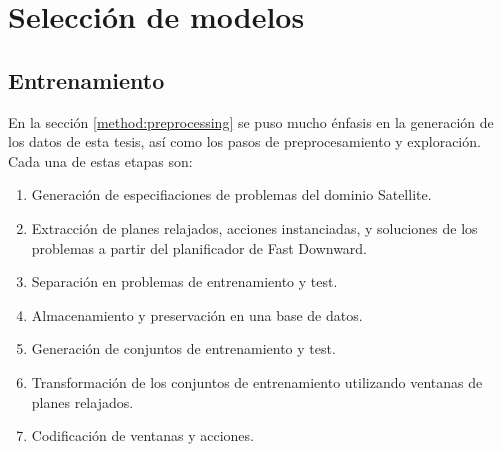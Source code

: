 \begin{table}[h!]
\centering
{}
 \caption{Ejemplos etiquetados a partir de un plan relajado y una acción}
 \label{tb:matrix_shape}
\end{table}

\section{Selección de modelos}

\subsection{Entrenamiento}

En la sección \ref{method:preprocessing} se puso mucho énfasis en la generación de los datos de esta tesis, así como los pasos de preprocesamiento y exploración. Cada una de estas etapas son:

\begin{enumerate}
    \item Generación de especifiaciones de problemas del dominio Satellite.
    \item Extracción de planes relajados, acciones instanciadas, y soluciones de los problemas a partir del planificador de Fast Downward.
    \item Separación en problemas de entrenamiento y test.
    \item Almacenamiento y preservación en una base de datos.
    \item Generación de conjuntos de entrenamiento y test.
    \item Transformación de los conjuntos de entrenamiento utilizando ventanas de planes relajados.
    \item Codificación de ventanas y acciones.
\end{enumerate}

